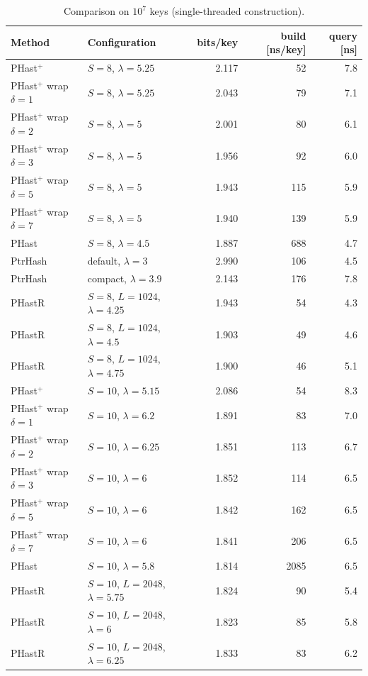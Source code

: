 \documentclass[11pt]{article}
\newcommand{\PHast}{PHast\xspace}
\newcommand{\PHastP}{PHast$^+$\xspace}
\newcommand{\PHastR}{PHastR\xspace}
\begin{document}
\begin{table}[t]
\centering
\caption{Comparison on $10^7$ keys (single-threaded construction).}
\label{tab:1e7}
\small
\begin{tabular}{llrrr}
\toprule
Method & Configuration & bits/key & build [ns/key] & query [ns] \\
\midrule
\PHastP & $S=8$, $\lambda=5.25$ & 2.117 & 52 & 7.8 \\
\PHastP wrap $\delta=1$ & $S=8$, $\lambda=5.25$ & 2.043 & 79 & 7.1 \\
\PHastP wrap $\delta=2$ & $S=8$, $\lambda=5$ & 2.001 & 80 & 6.1 \\
\PHastP wrap $\delta=3$ & $S=8$, $\lambda=5$ & 1.956 & 92 & 6.0 \\
\PHastP wrap $\delta=5$ & $S=8$, $\lambda=5$ & 1.943 & 115 & 5.9 \\
\PHastP wrap $\delta=7$ & $S=8$, $\lambda=5$ & 1.940 & 139 & 5.9 \\
\PHast & $S=8$, $\lambda=4.5$ & 1.887 & 688 & 4.7 \\
PtrHash & default, $\lambda=3$ & 2.990 & 106 & 4.5 \\
PtrHash & compact, $\lambda=3.9$ & 2.143 & 176 & 7.8 \\
\addlinespace
\PHastR & $S=8$, $L=1024$, $\lambda=4.25$ & 1.943 & 54 & 4.3 \\
\PHastR & $S=8$, $L=1024$, $\lambda=4.5$ & 1.903 & 49 & 4.6 \\
\PHastR & $S=8$, $L=1024$, $\lambda=4.75$ & 1.900 & 46 & 5.1 \\
\midrule
\PHastP & $S=10$, $\lambda=5.15$ & 2.086 & 54 & 8.3 \\
\PHastP wrap $\delta=1$ & $S=10$, $\lambda=6.2$ & 1.891 & 83 & 7.0 \\
\PHastP wrap $\delta=2$ & $S=10$, $\lambda=6.25$ & 1.851 & 113 & 6.7 \\
\PHastP wrap $\delta=3$ & $S=10$, $\lambda=6$ & 1.852 & 114 & 6.5 \\
\PHastP wrap $\delta=5$ & $S=10$, $\lambda=6$ & 1.842 & 162 & 6.5 \\
\PHastP wrap $\delta=7$ & $S=10$, $\lambda=6$ & 1.841 & 206 & 6.5 \\
\PHast & $S=10$, $\lambda=5.8$ & 1.814 & 2085 & 6.5 \\
\addlinespace
\PHastR & $S=10$, $L=2048$, $\lambda=5.75$ & 1.824 & 90 & 5.4 \\
\PHastR & $S=10$, $L=2048$, $\lambda=6$ & 1.823 & 85 & 5.8 \\
\PHastR & $S=10$, $L=2048$, $\lambda=6.25$ & 1.833 & 83 & 6.2 \\
\bottomrule
\end{tabular}
\end{table}
\end{document}
